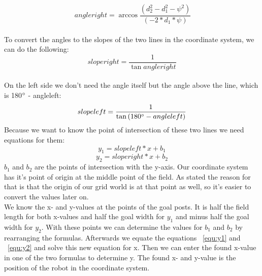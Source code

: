 \documentclass[lnicst,a4paper]{svmultln}
\begin{document}
\begin{equation}\
	angleright = \arccos{\frac{(d_{2}^2 - d_{1}^2 - \psi^2)}{(-2*d_{1}*\psi)}}
	\label{equ:angleright}
\end{equation}
\\
To convert the angles to the slopes of the two lines in the coordinate system, we can do the following:\\
\begin{equation}
	sloperight = \frac{1}{\tan{angleright}}
	\label{equ:sloperight}
\end{equation}
\\
On the left side we don't need the angle itself but the angle above the line, which is 180\(\degree\) - angleleft:
\begin{equation}
	slopeleft = \frac{1}{\tan{(180\degree - angleleft)}}
	\label{equ:slopeleft}
\end{equation}
Because we want to know the point of intersection of these two lines we need equations for them:
\begin{equation}
	y_{1} = slopeleft * x + b_{1}
	\label{equ:y1}
\end{equation}
\begin{equation}
	y_{2} = sloperight * x + b_{2}
	\label{equ:y2}
\end{equation}
\(b_{1}\) and \(b_{2}\) are the points of intersection with the y-axis. Our coordinate system has it's point of origin at the middle point of the field. As stated the reason for that is that the origin of our grid world is at that point as well, so it's easier to convert the values later on.
\\
We know the x- and y-values at the points of the goal posts. It is half the field length for both x-values and half the goal width for \(y_{1}\) and minus half the goal width for \(y_{2}\). With these points we can determine the values for \(b_{1}\) and \(b_{2}\) by rearranging the formulas. Afterwards we equate the equations ~\ref{equ:y1} and ~\ref{equ:y2} and solve this new equation for x. Then we can enter the found x-value in one of the two formulas to determine y. The found x- and y-value is the position of the robot in the coordinate system.
\\
\end{document}
